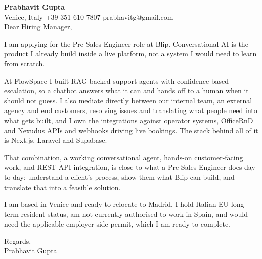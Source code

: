 \documentclass[a4paper,10.5pt]{article}
\begin{document}
\textbf{Prabhavit Gupta}\\
Venice, Italy \textbar{} +39 351 610 7807 \textbar{} prabhavitg@gmail.com\\[10pt]
Dear Hiring Manager,

I am applying for the Pre Sales Engineer role at Blip. Conversational AI is the product I already build inside a live platform, not a system I would need to learn from scratch.

At FlowSpace I built RAG-backed support agents with confidence-based escalation, so a chatbot answers what it can and hands off to a human when it should not guess. I also mediate directly between our internal team, an external agency and end customers, resolving issues and translating what people need into what gets built, and I own the integrations against operator systems, OfficeRnD and Nexudus APIs and webhooks driving live bookings. The stack behind all of it is Next.js, Laravel and Supabase.

That combination, a working conversational agent, hands-on customer-facing work, and REST API integration, is close to what a Pre Sales Engineer does day to day: understand a client's process, show them what Blip can build, and translate that into a feasible solution.

I am based in Venice and ready to relocate to Madrid. I hold Italian EU long-term resident status, am not currently authorised to work in Spain, and would need the applicable employer-side permit, which I am ready to complete.

Regards,\\
Prabhavit Gupta
\end{document}
